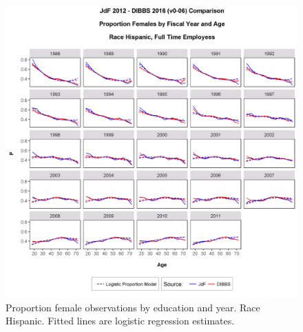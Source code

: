 \documentclass[10pt, letterpaper]{article}
\begin{document}
\begin{spacing}{1.0}
\begin{figure}[h]
    \centering
    \includegraphics[width=6.5in, trim={0 0 0 1in}, clip]{GenderProportionLogisticModelFYRaceAgeDv0-06.png}
    \caption{Proportion female observations by education and year.  Race Hispanic.  Fitted lines are logistic regression estimates.}
    \label{figure:GenderProportionLogisticModelFYRaceAgeD}
\end{figure}

\clearpage


\end{spacing}
\end{document}
